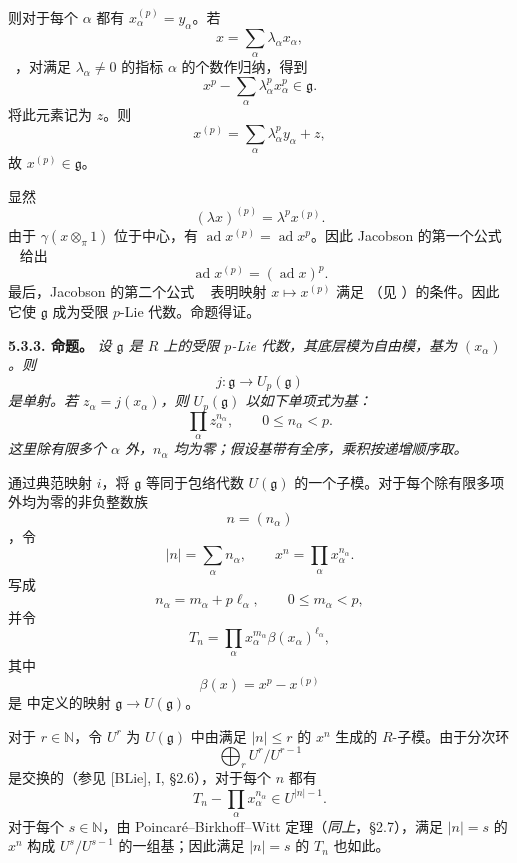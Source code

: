 则对于每个 \(\alpha\) 都有 \(x_\alpha^{(p)}=y_\alpha\)。若
\[
  x=\sum_\alpha\lambda_\alpha x_\alpha,
\]
~，对满足 \(\lambda_\alpha\ne0\) 的指标 \(\alpha\) 的个数作归纳，得到
\[
  x^p-\sum_\alpha\lambda_\alpha^p x_\alpha^p
  \in\mathfrak g.
\]
将此元素记为 \(z\)。则
\[
  x^{(p)}
  =
  \sum_\alpha\lambda_\alpha^p y_\alpha+z,
\]
故 \(x^{(p)}\in\mathfrak g\)。

显然
\[
  (\lambda x)^{(p)}
  =
  \lambda^p x^{(p)}.
\]
由于 \(\gamma(x\otimes_\pi1)\) 位于中心，有
\(\operatorname{ad}x^{(p)}=\operatorname{ad}x^p\)。因此 Jacobson 的第一个公式 ~ 给出
\[
  \operatorname{ad}x^{(p)}
  =
  (\operatorname{ad}x)^p.
\]
最后，Jacobson 的第二个公式 ~ 表明映射
\(x\mapsto x^{(p)}\) 满足  （见 ）的条件。因此它使 \(\mathfrak g\) 成为受限 \(p\)-Lie 代数。命题得证。

\medskip
\noindent\textbf{5.3.3. 命题。}
\label{sga3:VIIA:5.3.3}
\textit{设 \(\mathfrak g\) 是 \(R\) 上的受限 \(p\)-Lie 代数，其底层模为自由模，基为 \((x_\alpha)\)。则
\[
  j:\mathfrak g\longrightarrow U_p(\mathfrak g)
\]
是单射。若 \(z_\alpha=j(x_\alpha)\)，则 \(U_p(\mathfrak g)\) 以如下单项式为基：
\[
  \prod_\alpha z_\alpha^{n_\alpha},
  \qquad
  0\le n_\alpha<p.
\]
这里除有限多个 \(\alpha\) 外，\(n_\alpha\) 均为零；假设基带有全序，乘积按递增顺序取。}

通过典范映射 \(i\)，将 \(\mathfrak g\) 等同于包络代数 \(U(\mathfrak g)\) 的一个子模。对于每个除有限多项外均为零的非负整数族
\[
  n=(n_\alpha)
\]
，令
\[
  |n|=\sum_\alpha n_\alpha,
  \qquad
  x^n=\prod_\alpha x_\alpha^{n_\alpha}.
\]
写成
\[
  n_\alpha=m_\alpha+p\ell_\alpha,
  \qquad
  0\le m_\alpha<p,
\]
并令
\[
  T_n
  =
  \prod_\alpha
  x_\alpha^{m_\alpha}
  \beta(x_\alpha)^{\ell_\alpha},
\]
其中
\[
  \beta(x)=x^p-x^{(p)}
\]
是  中定义的映射 \(\mathfrak g\to U(\mathfrak g)\)。

对于 \(r\in\mathbb N\)，令 \(U^r\) 为 \(U(\mathfrak g)\) 中由满足 \(|n|\le r\) 的 \(x^n\) 生成的 \(R\)-子模。由于分次环
\[
  \bigoplus_r U^r/U^{r-1}
\]
是交换的（参见 \textup{[BLie]}, I, \S2.6），对于每个 \(n\) 都有
\[
  T_n-\prod_\alpha x_\alpha^{n_\alpha}
  \in U^{|n|-1}.
\]
对于每个 \(s\in\mathbb N\)，由 Poincar\'e--Birkhoff--Witt 定理（\emph{同上}，\S2.7），满足 \(|n|=s\) 的 \(x^n\) 构成 \(U^s/U^{s-1}\) 的一组基；因此满足 \(|n|=s\) 的 \(T_n\) 也如此。

